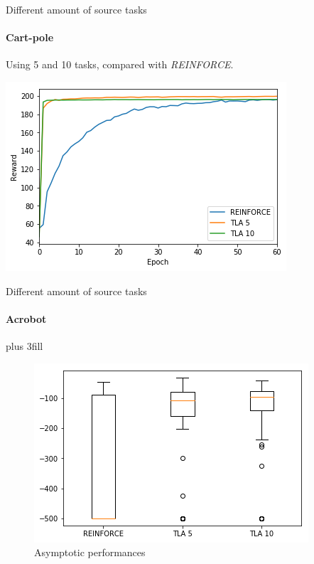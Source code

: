 \begin{frame}[fragile]{Different amount of source tasks}
\framesubtitle{Cart-pole}
Using 5 and 10 tasks, compared with \textit{REINFORCE}.
\begin{center}
    \includegraphics[width=.8\linewidth]{results/CartPole/no_sparse_transfer/reward_target_re-akt5-akt10.png}
\end{center}
\end{frame}

\begin{frame}[fragile]{Different amount of source tasks}
\framesubtitle{Acrobot}
\vskip0pt plus 3fill
\begin{figure}[htb]
    \centering
    \includegraphics[width=.8\linewidth]{results/Acrobot/no_sparse_transfer/asymp_target_re-akt5-akt10.png}
    \caption{Asymptotic performances}
\end{figure}
\end{frame}

